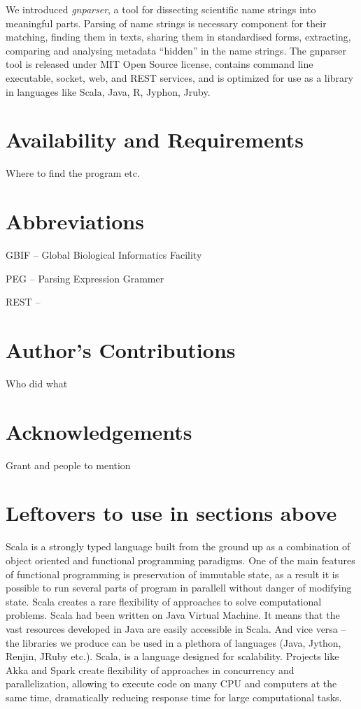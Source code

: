\documentclass{bmcart}
\begin{document}
We introduced \textit{gnparser}, a tool for dissecting scientific name strings
into meaningful parts. Parsing of name strings is necessary component for their
matching, finding them in texts, sharing them in standardised forms,
extracting, comparing and analysing metadata ``hidden'' in the name strings.
The gnparser tool is released under MIT Open Source license, contains command
line executable, socket, web, and REST services, and is optimized for use as a
library in languages like Scala, Java, R, Jyphon, Jruby.

\section*{Availability and Requirements}

Where to find the program etc.

\section*{Abbreviations}

GBIF -- Global Biological Informatics Facility

PEG -- Parsing Expression Grammer

REST --

\section*{Author's Contributions}

Who did what

\section*{Acknowledgements}

Grant and people to mention

\section*{Leftovers to use in sections above}
Scala is a strongly typed language built from the ground up as a combination of
object oriented and functional programming paradigms. One of the main features
of functional programming is preservation of immutable state, as a result it is
possible to run several parts of program in parallell without danger of
modifying state. Scala creates a rare flexibility of approaches to solve
computational problems. Scala had been written on Java Virtual Machine. It
means that the vast resources developed in Java are easily accessible in Scala.
And vice versa -- the libraries we produce can be used in a plethora of
languages (Java, Jython, Renjin, JRuby etc.). Scala, is a language designed for
scalability. Projects like Akka and Spark create flexibility of approaches in
concurrency and parallelization, allowing to execute code on many CPU and
computers at the same time, dramatically reducing response time for large
computational tasks.
\end{document}

